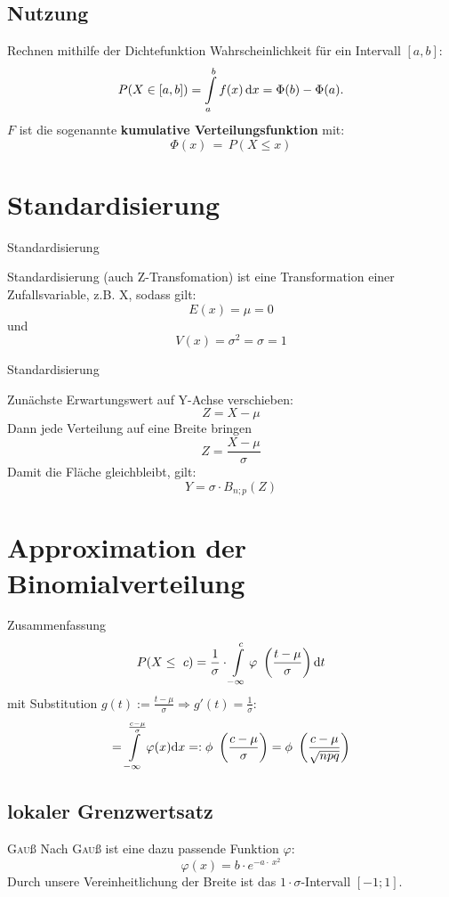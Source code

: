 \documentclass[14pt]{beamer}
\begin{document}
\subsection{Nutzung}
\begin{frame}{Rechnen mithilfe der Dichtefunktion}
Wahrscheinlichkeit für ein Intervall $[a,b]$:
$$P(X\in [a,b]) = \int\displaylimits_a^b f(x)\, {\rm d}x = \Phi(b)-\Phi(a).$$
$F$ ist die sogenannte \textbf{kumulative Verteilungsfunktion} mit:
$$\Phi(x) \, = \, P(X \le x)$$
\end{frame}


\section{Standardisierung}

\begin{frame} {Standardisierung}

Standardisierung (auch Z-Transfomation) ist eine Transformation einer Zufallsvariable, z.B. X, sodass gilt: $$E(x) = \mu = 0$$ und $$V(x) = \sigma^2 = \sigma = 1$$

\end{frame}

\begin{frame} {Standardisierung}

Zunächste Erwartungswert auf Y-Achse verschieben:
$$ Z = X - \mu $$
Dann jede Verteilung auf eine Breite bringen
$$ Z = \frac{X - \mu}{\sigma} $$
Damit die Fläche gleichbleibt, gilt:
$$ Y = \sigma \cdot B_{n;p}(Z) $$

\end{frame}




\section{Approximation der Binomialverteilung}


\begin{frame}{Zusammenfassung}
$$
P(X\leq\ c) = \frac{1}{\sigma} \cdot \int\displaylimits^c_{-\infty} \varphi\ \left(\frac{t-\mu}{\sigma}\right) {\mathrm d}t
$$
mit Substitution $g(t):=\frac{t-\mu}{\sigma} \Rightarrow g'(t)=\frac{1}{\sigma}$:
$$
= \int\displaylimits^{\frac{c-\mu}{\sigma}}_{-\infty} \varphi(x) {\mathrm d}x =: \phi\ \left(\frac{c-\mu}{\sigma}\right) = \phi\ \left( \frac{c-\mu}{\sqrt{npq}}\right)
$$
\end{frame}

\subsection{lokaler Grenzwertsatz}
\begin{frame}{\textrm{\textsc{Gau}ß}}
Nach \textrm{\textsc{Gau}ß} ist eine dazu passende Funktion $\varphi$:
$$
\varphi(x)=b\cdot e^{-a\cdot\ x^2}
$$
Durch unsere Vereinheitlichung der Breite ist das $1\cdot \sigma$-Intervall $[-1;1]$.
\end{frame}
\end{document}
